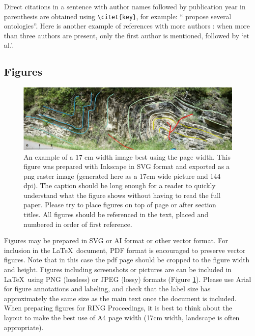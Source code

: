 \documentclass[final]{ring}
\begin{document}
Direct citations in a sentence with author names followed by publication year in parenthesis are obtained using \verb|\citet{key}|, for example: ``\citet{Perrin2013} propose several ontologies''. 
Here is another example of references with more authors \citep{Collon2017G, Freeman1990FB, Kolditz2012EES}: when more than three authors are present, only the first author is mentioned, followed by `et al.'. 

\subsection{Figures}
\begin{figure}
\centering\includegraphics[width=\textwidth]{Hecho}
\caption{An example of a 17 cm width image best using the page width. This figure was prepared with Inkscape in SVG format and exported as a png raster image (generated here as a 17cm wide picture and 144 dpi). The caption should be long enough for a reader to quickly understand what the figure shows without having to read the full paper. Please try to place figures on top of page or after section titles. All figures should be referenced in the text, placed and numbered in order of first reference.}
\label{fig:example}
\end{figure}

Figures may be prepared in SVG or AI format or other vector format. For inclusion in the \LaTeX\ document, PDF format is encouraged to preserve vector figures. Note that in this case the pdf page should be cropped to the figure width and height. Figures including screenshots or pictures are can be included in \LaTeX\ using PNG (lossless) or JPEG (lossy) formats (Figure \ref{fig:example}). Please use Arial for figure annotations and labeling, and check that the label size has approximately the same size as the main text once the document is included. When preparing figures for RING Proceedings, it is best to think about the layout to make the best use of A4 page width (17cm width, landscape is often appropriate). 
\end{document}
